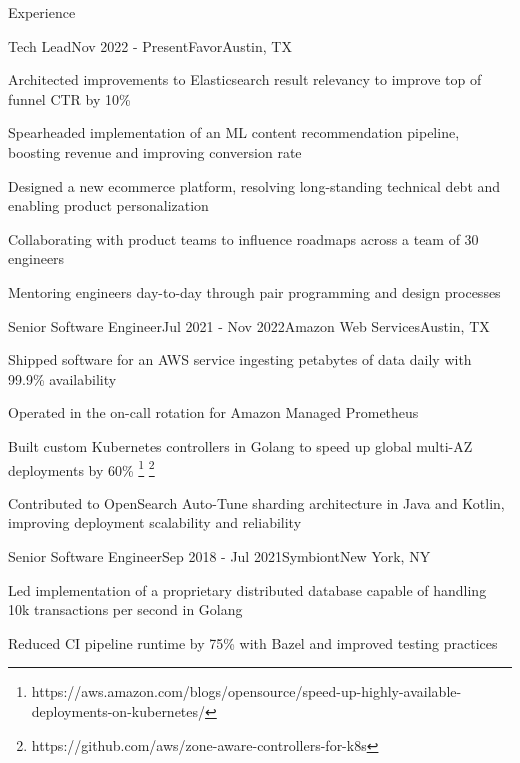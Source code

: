 \documentclass[
	10pt, %
]{resume} %
\begin{document}

\begin{rSection}{Experience}

	\begin{rSubsection}{Tech Lead}{Nov 2022 - Present}{Favor}{Austin, TX}
        \item Architected improvements to Elasticsearch result relevancy to improve top of funnel CTR by 10\%
        \item Spearheaded implementation of an ML content recommendation pipeline, boosting revenue and improving conversion rate
        \item Designed a new ecommerce platform, resolving long-standing technical debt and enabling product personalization
        \item Collaborating with product teams to influence roadmaps across a team of 30 engineers
        \item Mentoring engineers day-to-day through pair programming and design processes
	\end{rSubsection}


    \begin{rSubsection}{Senior Software Engineer}{Jul 2021 - Nov 2022}{Amazon Web Services}{Austin, TX}
        \item Shipped software for an AWS service ingesting petabytes of data daily with 99.9\% availability
        \item Operated in the on-call rotation for Amazon Managed Prometheus
        \item Built custom Kubernetes controllers in Golang to speed up global multi-AZ deployments by 60\% \footnote{https://aws.amazon.com/blogs/opensource/speed-up-highly-available-deployments-on-kubernetes/} \footnote{https://github.com/aws/zone-aware-controllers-for-k8s}
        \item Contributed to OpenSearch Auto-Tune sharding architecture in Java and Kotlin, improving deployment scalability and reliability
    \end{rSubsection}
    

    \begin{rSubsection}{Senior Software Engineer}{Sep 2018 - Jul 2021}{Symbiont}{New York, NY}
        \item Led implementation of a proprietary distributed database capable of handling 10k transactions per second in Golang
        \item Reduced CI pipeline runtime by 75\% with Bazel and improved testing practices
    \end{rSubsection}


\end{rSection}
\end{document}
